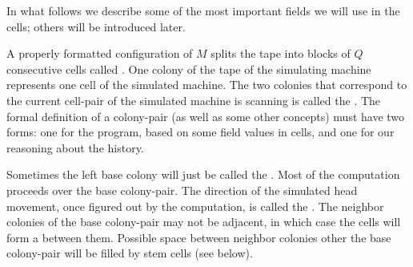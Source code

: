 \documentclass[11pt]{memoir}
\theoremstyle{definition} %
\newcommand{\Q}{Q} %
\begin{document}
In what follows we describe some of the most important fields we will use in the cells;
others will be introduced later.

A properly formatted configuration of \( M \) splits the tape into blocks of \( \Q \)
consecutive cells called .
One colony of the tape of the simulating
machine represents one cell of the simulated machine.
The two colonies that correspond to the current cell-pair of the
simulated machine is scanning is called the .
The formal definition of a colony-pair (as well as some other concepts) must have two
forms: one for the program, based on some field values in cells,
and one for our reasoning about the history.

Sometimes the left base colony will just be called the .
Most of the computation proceeds over the base colony-pair.
The direction of the simulated head movement, once figured out by the computation,
is called the .
The neighbor colonies of the base colony-pair may not be adjacent, in which case the cells will form
a  between them.
Possible space between neighbor colonies other the base colony-pair will be filled by stem cells (see below).
\end{document}
